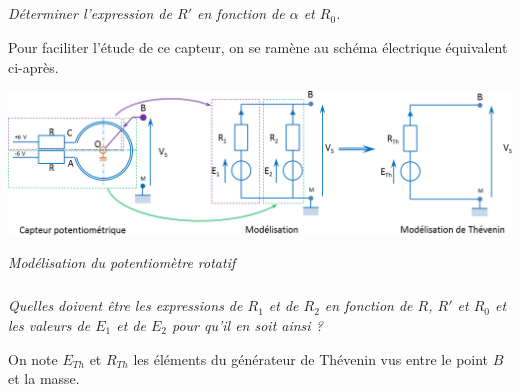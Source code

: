 \documentclass[10pt]{article}
\newif\ifprof
\begin{document}
\subparagraph{}
\textit{Déterminer l'expression de $R'$ en fonction de $\alpha$ et $R_0$. }
 
\ifprof
\begin{corrige}
Lorsque $\alpha = -\pi$, $R' = 0$; lorsque $\alpha = \pi$, $R' = R_0 $. La variation de résistance est proportionnelle au secteur angulaire, on a donc : 
$$ R' (\alpha)= \dfrac{R_0}{2} + \dfrac{R_0}{2\pi} \alpha  $$
\end{corrige}
\else
\fi

Pour faciliter l'étude de ce capteur, on se ramène au schéma électrique équivalent ci-après.

\begin{center}
\includegraphics[width=\textwidth]{images/modele}

\textit{Modélisation du potentiomètre rotatif}
\end{center}

\subparagraph{}
\textit{Quelles doivent être les expressions de $R_1$ et de $R_2$ en fonction de $R$, $R'$ et $R_0$ et les valeurs de $E_1$ et de $E_2$ pour qu'il en soit ainsi ?}
\ifprof
\begin{corrige}

Pour que la modélisation soit conforme au capteur initial, il faut nécessairement que : 
\begin{itemize}
\item $R_1 = R + R_0 - R'$;
\item $R_2 = R + R'$;
\item $E_1 = +6 V$; 
\item $E_2 = -6 V$.
\end{itemize}
\end{corrige}
\else
\fi

On note $E_{Th}$ et $R_{Th}$ les éléments du générateur de Thévenin vus entre le point $B$ et la masse. 
\end{document}
